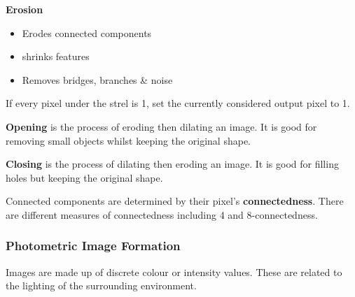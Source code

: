 \documentclass{beamer}
\begin{document}
\begin{frame}[allowframebreaks]
  \textbf{Erosion}

  \begin{itemize}
    \item Erodes connected components
    \item shrinks features
    \item Removes bridges, branches \& noise
  \end{itemize}

  If every pixel under the strel is 1, set the currently considered output pixel to 1.

  \textbf{Opening} is the process of eroding then dilating an image. It is good for removing small objects whilst keeping the original shape.

  \textbf{Closing} is the process of dilating then eroding an image. It is good for filling holes but keeping the original shape.

  \framebreak

  Connected components are determined by their pixel's \textbf{connectedness}. There are different measures of connectedness including 4 and 8-connectedness.
\end{frame}

\begin{frame}[allowframebreaks]
  \frametitle{Photometric Image Formation}

  Images are made up of discrete colour or intensity values. These are related to the lighting of the surrounding environment.
\end{frame}
\end{document}
